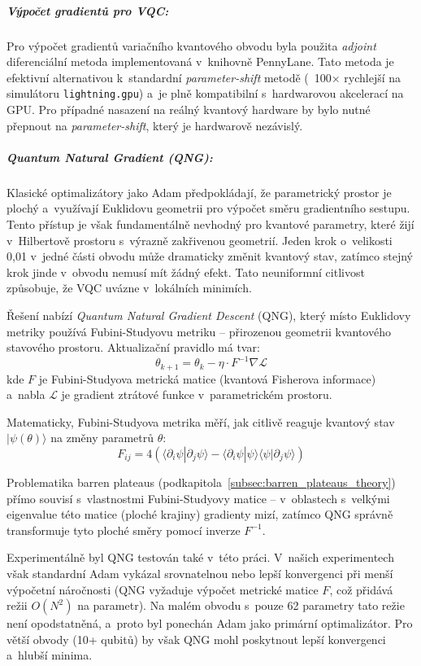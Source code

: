 \documentclass[12pt, a4paper]{report}
\begin{document}
\subparagraph{Výpočet gradientů pro VQC:}
Pro výpočet gradientů variačního kvantového obvodu byla použita \textit{adjoint} diferenciální metoda implementovaná v~knihovně PennyLane. Tato metoda je efektivní alternativou k~standardní \textit{parameter-shift} metodě (~100× rychlejší na simulátoru \texttt{lightning.gpu}) a~je plně kompatibilní s~hardwarovou akcelerací na GPU. Pro případné nasazení na reálný kvantový hardware by bylo nutné přepnout na \textit{parameter-shift}, který je hardwarově nezávislý.

\subparagraph{Quantum Natural Gradient (QNG):}
Klasické optimalizátory jako Adam předpokládají, že parametrický prostor je plochý a~využívají Euklidovu geometrii pro výpočet směru gradientního sestupu. Tento přístup je však fundamentálně nevhodný pro kvantové parametry, které žijí v~Hilbertově prostoru s~výrazně zakřivenou geometrií. Jeden krok o~velikosti 0{,}01 v~jedné části obvodu může dramaticky změnit kvantový stav, zatímco stejný krok jinde v~obvodu nemusí mít žádný efekt. Tato neuniformní citlivost způsobuje, že VQC uvázne v~lokálních minimích.

Řešení nabízí \textit{Quantum Natural Gradient Descent} (QNG), který místo Euklidovy metriky používá Fubini-Studyovu metriku – přirozenou geometrii kvantového stavového prostoru. Aktualizační pravidlo má tvar:
\begin{equation}
    \theta_{k+1} = \theta_k - \eta \cdot F^{-1} \nabla \mathcal{L}
\end{equation}
kde $F$ je Fubini-Studyova metrická matice (kvantová Fisherova informace) a~nabla $\mathcal{L}$ je gradient ztrátové funkce v~parametrickém prostoru.

Matematicky, Fubini-Studyova metrika měří, jak citlivě reaguje kvantový stav $|\psi(\theta)\rangle$ na změny parametrů $\theta$:
\begin{equation}
    F_{ij} = 4 \left( \langle \partial_i \psi | \partial_j \psi \rangle - \langle \partial_i \psi | \psi \rangle \langle \psi | \partial_j \psi \rangle \right)
\end{equation}

Problematika barren plateaus (podkapitola~\ref{subsec:barren_plateaus_theory}) přímo souvisí s~vlastnostmi Fubini-Studyovy matice – v~oblastech s~velkými eigenvalue této matice (ploché krajiny) gradienty mizí, zatímco QNG správně transformuje tyto ploché směry pomocí inverze $F^{-1}$.

Experimentálně byl QNG testován také v~této práci. V~našich experimentech však standardní Adam vykázal srovnatelnou nebo lepší konvergenci při menší výpočetní náročnosti (QNG vyžaduje výpočet metrické matice $F$, což přidává režii $O(N^2)$ na parametr). Na malém obvodu s~pouze 62 parametry tato režie není opodstatněná, a~proto byl ponechán Adam jako primární optimalizátor. Pro větší obvody (10+ qubitů) by však QNG mohl poskytnout lepší konvergenci a~hlubší minima.
\end{document}
